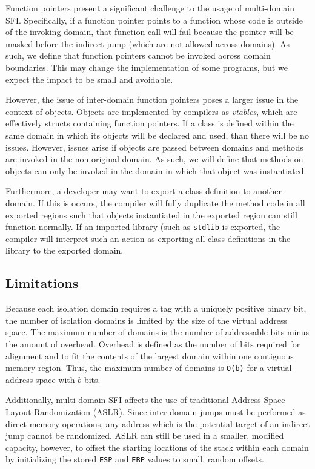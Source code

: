 \documentclass[12pt]{IEEEtran}
\begin{document}
Function pointers present a significant challenge to the usage of multi-domain SFI. Specifically, if a function pointer points to a function whose code is outside of the invoking domain, that function call will fail because the pointer will be masked before the indirect jump (which are not allowed across domains). As such, we define that function pointers cannot be invoked across domain boundaries. This may change the implementation of some programs, but we expect the impact to be small and avoidable.

However, the issue of inter-domain function pointers poses a larger issue in the context of objects. Objects are implemented by compilers as \textit{vtables}, which are effectively structs containing function pointers. If a class is defined within the same domain in which its objects will be declared and used, than there will be no issues. However, issues arise if objects are passed between domains and methods are invoked in the non-original domain. As such, we will define that methods on objects can only be invoked in the domain in which that object was instantiated.

Furthermore, a developer may want to export a class definition to another domain. If this is occurs, the compiler will fully duplicate the method code in all exported regions such that objects instantiated in the exported region can still function normally. If an imported library (such as \texttt{stdlib} is exported, the compiler will interpret such an action as exporting all class definitions in the library to the exported domain.

\subsection{Limitations}

Because each isolation domain requires a tag with a uniquely positive binary bit, the number of isolation domains is limited by the size of the virtual address space. The maximum number of domains is the number of addressable bits minus the amount of overhead. Overhead is defined as the number of bits required for alignment and to fit the contents of the largest domain within one contiguous memory region. Thus, the maximum number of domains is \texttt{O(b)} for a virtual address space with $b$ bits.

Additionally, multi-domain SFI affects the use of traditional Address Space Layout Randomization (ASLR). Since inter-domain jumps must be performed as direct memory operations, any address which is the potential target of an indirect jump cannot be randomized. ASLR can still be used in a smaller, modified capacity, however, to offset the starting locations of the stack within each domain by initializing the stored \texttt{ESP} and \texttt{EBP} values to small, random offsets.
\end{document}
